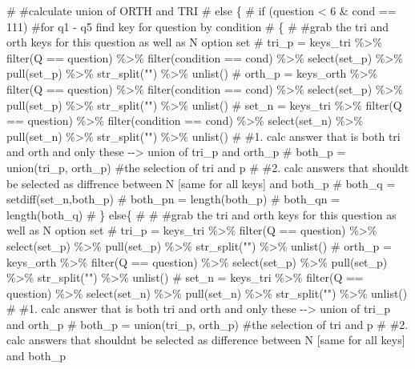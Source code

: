 \documentclass[
  letterpaper,
  DIV=11,
  numbers=noendperiod]{scrreprt}
\newenvironment{Shaded}{\begin{snugshade}}{\end{snugshade}}
\newcommand{\CommentTok}[1]{\textcolor[rgb]{0.37,0.37,0.37}{#1}}
\begin{document}
\begin{Shaded}
\begin{Highlighting}[]
\CommentTok{\#   \#calculate union of ORTH and TRI}
\CommentTok{\#   else \{}
\CommentTok{\#     if (question \textless{} 6 \& cond == 111) \#for q1 {-} q5 find key for question by condition}
\CommentTok{\#   \{}
\CommentTok{\#      \#grab the tri and orth keys for this question as well as N option set}
\CommentTok{\#      tri\_p =  keys\_tri \%\textgreater{}\%  filter(Q == question) \%\textgreater{}\% filter(condition == cond) \%\textgreater{}\% select(set\_p) \%\textgreater{}\% pull(set\_p) \%\textgreater{}\% str\_split("") \%\textgreater{}\% unlist()}
\CommentTok{\#      orth\_p = keys\_orth \%\textgreater{}\% filter(Q == question) \%\textgreater{}\% filter(condition == cond) \%\textgreater{}\% select(set\_p) \%\textgreater{}\% pull(set\_p) \%\textgreater{}\% str\_split("") \%\textgreater{}\% unlist()}
\CommentTok{\#      set\_n =  keys\_tri \%\textgreater{}\%  filter(Q == question) \%\textgreater{}\% filter(condition == cond) \%\textgreater{}\% select(set\_n) \%\textgreater{}\% pull(set\_n) \%\textgreater{}\% str\_split("") \%\textgreater{}\% unlist() }
\CommentTok{\#      \#1. calc answer that is both tri and orth and only these {-}{-}\textgreater{} union of tri\_p and orth\_p}
\CommentTok{\#      both\_p = union(tri\_p, orth\_p) \#the selection of tri and p}
\CommentTok{\#      \#2. calc answers that should\textquotesingle{}t be selected as diffrence between N [same for all keys] and both\_p}
\CommentTok{\#      both\_q = setdiff(set\_n,both\_p)}
\CommentTok{\#      both\_pn = length(both\_p)}
\CommentTok{\#      both\_qn = length(both\_q)}
\CommentTok{\#   \} else\{}
\CommentTok{\#     }
\CommentTok{\#      \#grab the tri and orth keys for this question as well as N option set}
\CommentTok{\#      tri\_p =  keys\_tri \%\textgreater{}\%  filter(Q == question) \%\textgreater{}\% select(set\_p) \%\textgreater{}\% pull(set\_p) \%\textgreater{}\% str\_split("") \%\textgreater{}\% unlist()}
\CommentTok{\#      orth\_p = keys\_orth \%\textgreater{}\% filter(Q == question) \%\textgreater{}\% select(set\_p) \%\textgreater{}\% pull(set\_p) \%\textgreater{}\% str\_split("") \%\textgreater{}\% unlist()}
\CommentTok{\#      set\_n =  keys\_tri \%\textgreater{}\%  filter(Q == question) \%\textgreater{}\% select(set\_n) \%\textgreater{}\% pull(set\_n) \%\textgreater{}\% str\_split("") \%\textgreater{}\% unlist() }
\CommentTok{\#      \#1. calc answer that is both tri and orth and only these {-}{-}\textgreater{} union of tri\_p and orth\_p}
\CommentTok{\#      both\_p = union(tri\_p, orth\_p) \#the selection of tri and p}
\CommentTok{\#      \#2. calc answers that shouldn\textquotesingle{}t be selected as difference between N [same for all keys] and both\_p}

\end{Highlighting}
\end{Shaded}
\end{document}
